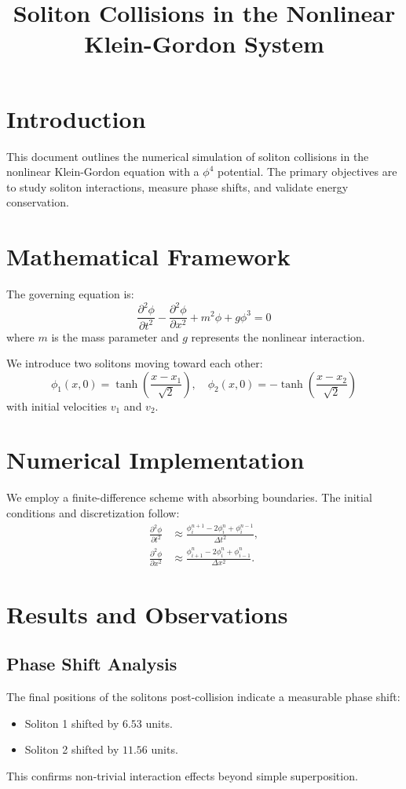 \documentclass{article}
\title{Soliton Collisions in the Nonlinear Klein-Gordon System}
\author{}
\date{}
\begin{document}
\maketitle

\section{Introduction}
This document outlines the numerical simulation of soliton collisions in the nonlinear Klein-Gordon equation with a $\phi^4$ potential. The primary objectives are to study soliton interactions, measure phase shifts, and validate energy conservation.

\section{Mathematical Framework}
The governing equation is:
\begin{equation}
\frac{\partial^2 \phi}{\partial t^2} - \frac{\partial^2 \phi}{\partial x^2} + m^2 \phi + g \phi^3 = 0
\end{equation}
where $m$ is the mass parameter and $g$ represents the nonlinear interaction.

We introduce two solitons moving toward each other:
\begin{equation}
\phi_1(x, 0) = \tanh\left(\frac{x - x_1}{\sqrt{2}}\right), \quad 
\phi_2(x, 0) = -\tanh\left(\frac{x - x_2}{\sqrt{2}}\right)
\end{equation}
with initial velocities $v_1$ and $v_2$.

\section{Numerical Implementation}
We employ a finite-difference scheme with absorbing boundaries. The initial conditions and discretization follow:
\begin{align}
\frac{\partial^2 \phi}{\partial t^2} &\approx \frac{\phi^{n+1}_i - 2\phi^n_i + \phi^{n-1}_i}{\Delta t^2}, \\
\frac{\partial^2 \phi}{\partial x^2} &\approx \frac{\phi^n_{i+1} - 2\phi^n_i + \phi^n_{i-1}}{\Delta x^2}.
\end{align}

\section{Results and Observations}
\subsection{Phase Shift Analysis}
The final positions of the solitons post-collision indicate a measurable phase shift:
\begin{itemize}
    \item Soliton 1 shifted by $6.53$ units.
    \item Soliton 2 shifted by $11.56$ units.
\end{itemize}
This confirms non-trivial interaction effects beyond simple superposition.
\end{document}
